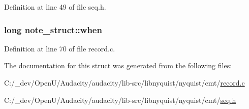 Definition at line 49 of file seq.\+h.

\subsubsection[{\texorpdfstring{when}{when}}]{\setlength{\rightskip}{0pt plus 5cm}long note\+\_\+struct\+::when}\hypertarget{unionnote__struct_a5e75e5fdc5643f7d59087dbab93cf0b8}{}\label{unionnote__struct_a5e75e5fdc5643f7d59087dbab93cf0b8}


Definition at line 70 of file record.\+c.



The documentation for this struct was generated from the following files\+:\begin{DoxyCompactItemize}
\item 
C\+:/\+\_\+dev/\+Open\+U/\+Audacity/audacity/lib-\/src/libnyquist/nyquist/cmt/\hyperlink{record_8c}{record.\+c}\item 
C\+:/\+\_\+dev/\+Open\+U/\+Audacity/audacity/lib-\/src/libnyquist/nyquist/cmt/\hyperlink{seq_8h}{seq.\+h}\end{DoxyCompactItemize}
